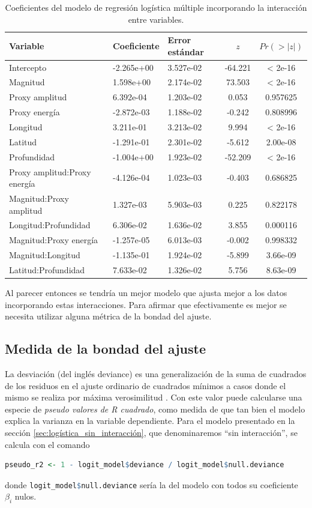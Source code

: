 \documentclass[a4paper]{report}
\begin{document}
\begin{table}
	\centering
	\begin{tabular}{lllcc}
		\toprule
		Variable & Coeficiente & Error estándar & \(z\) & \(Pr(>|z|)\) \\
		\midrule
		Intercepto & -2.265e+00 & 3.527e-02 & -64.221 & < 2e-16 \\
		Magnitud & 1.598e+00 & 2.174e-02 & 73.503 & < 2e-16 \\
		Proxy amplitud & 6.392e-04 & 1.203e-02 & 0.053 & 0.957625 \\
		Proxy energía & -2.872e-03 & 1.188e-02 & -0.242 & 0.808996 \\
		Longitud & 3.211e-01 & 3.213e-02 & 9.994 & < 2e-16 \\
		Latitud & -1.291e-01 & 2.301e-02 & -5.612 & 2.00e-08 \\
		Profundidad & -1.004e+00 & 1.923e-02 & -52.209 & < 2e-16 \\
		Proxy amplitud:Proxy energía & -4.126e-04 & 1.023e-03 & -0.403 & 0.686825 \\
		Magnitud:Proxy amplitud & 1.327e-03 & 5.903e-03 & 0.225 & 0.822178 \\
		Longitud:Profundidad & 6.306e-02 & 1.636e-02 & 3.855 & 0.000116 \\
		Magnitud:Proxy energía & -1.257e-05 & 6.013e-03 & -0.002 & 0.998332 \\
		Magnitud:Longitud & -1.135e-01 & 1.924e-02 & -5.899 & 3.66e-09 \\
		Latitud:Profundidad & 7.633e-02 & 1.326e-02 & 5.756 & 8.63e-09 \\
		\bottomrule
	\end{tabular}
	\caption{Coeficientes del modelo de regresión logística múltiple incorporando la interacción entre variables.}
	\label{tab:coeficientes_interaccion}
\end{table}

Al parecer entonces se tendría un mejor modelo que ajusta mejor a los datos incorporando estas interacciones.
Para afirmar que efectivamente es mejor se necesita utilizar alguna métrica de la bondad del ajuste.



\subsection{Medida de la bondad del ajuste}\label{sec:bondad}
La desviación (del inglés deviance) es una generalización de la suma de cuadrados de los residuos en el ajuste ordinario de cuadrados mínimos a casos donde el mismo se realiza por máxima verosimilitud \cite[sección 7.2]{hastie_elements_2009}.
Con este valor puede calcularse una especie de \emph{pseudo valores de R cuadrado}, como medida de que tan bien el modelo explica la varianza en la variable dependiente.
Para el modelo presentado en la sección \ref{sec:logística_sin_interacción}, que denominaremos ``sin interacción'', se calcula con el comando
\begin{lstlisting}[language=R, breaklines=true]
	pseudo_r2 <- 1 - logit_model$deviance / logit_model$null.deviance
\end{lstlisting}
donde \lstinline[language=R]{logit_model$null.deviance} sería la del modelo con todos su coeficiente \(\beta_i\) nulos. 
\end{document}
